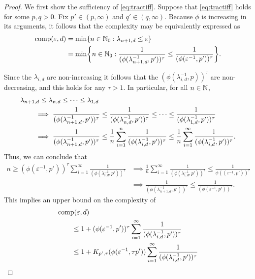 \documentclass{article}
\theoremstyle{definition}
\begin{document}
\begin{proof}
We first show the sufficiency of \eqref{eq:tractiff}. Suppose that \eqref{eq:tractiff} holds for some $p,q>0$. Fix $p'\in (p,\infty)$ and $q'\in (q,\infty)$. Because $\phi$ is increasing in its arguments, it follows that the complexity may be equivalently expressed as 
\begin{align*}
    \operatorname{comp}(\varepsilon, d) &= \min \{n \in \mathbb{N}_{0} : \lambda_{n+1, d} \le \varepsilon\} \\
    &= \min \biggl\{n \in \mathbb{N}_{0} : \frac{1}{(\phi(\lambda_{n+1, d}^{-1},p'))^\tau} \le \frac{1}{(\phi(\varepsilon^{-1},p'))^\tau} \biggr\}.
\end{align*}

Since the $\lambda_{i,d}$ are non-increasing it follows that the $(\phi(\lambda_{i, d}^{-1},p))^\tau$ are non-decreasing, and this holds for any $\tau>1$.  In particular, for all $n \in \mathbb{N}$,
\begin{align*}
    \MoveEqLeft{\lambda_{n+1,d} \le \lambda_{n,d} \le \cdots \le \lambda_{1,d}} \\
    & \implies \frac{1}{(\phi(\lambda_{n+1, d}^{-1},p'))^\tau} \le \frac{1}{(\phi(\lambda_{n, d}^{-1},p'))^\tau} \le \cdots \le \frac{1}{(\phi(\lambda_{1, d}^{-1},p'))^\tau} \\
    & \implies \frac{1}{(\phi(\lambda_{n+1, d}^{-1},p'))^\tau} 
    \le \frac 1n \sum_{i=1}^n  \frac{1}{(\phi(\lambda_{i, d}^{-1},p'))^\tau} 
    \le \frac 1n \sum_{i=1}^\infty  \frac{1}{(\phi(\lambda_{i, d}^{-1},p'))^\tau}.
\end{align*}
Thus, we can conclude that 
\begin{align*}
    n \ge (\phi(\varepsilon^{-1},p'))^\tau \sum_{i=1}^\infty \frac{1}{(\phi(\lambda_{i, d}^{-1},p'))^\tau}
    & \implies 
  \frac 1n \sum_{i=1}^\infty \frac{1}{(\phi(\lambda_{i, d}^{-1},p'))^\tau} \le  \frac{1}{\phi((\varepsilon^{-1},p'))^\tau} \\
   & \implies   \frac{1}{(\phi(\lambda_{n+1, d}^{-1},p'))^\tau} \le \frac{1}{(\phi(\varepsilon^{-1},p'))^\tau}.
\end{align*}
This implies an upper bound on the complexity of
\begin{align*}
       \MoveEqLeft{\comp(\varepsilon,d)} \\
       &\le 1 + (\phi(\varepsilon^{-1},p'))^\tau \sum_{i=1}^\infty \frac{1}{(\phi(\lambda_{i, d}^{-1},p'))^\tau} \\
       &\le 1 +K_{p',\tau} (\phi(\varepsilon^{-1},\tau p')) \sum_{i=1}^\infty \frac{1}{(\phi(\lambda_{i, d}^{-1},p'))^\tau} \\

\end{align*}
\end{proof}
\end{document}
